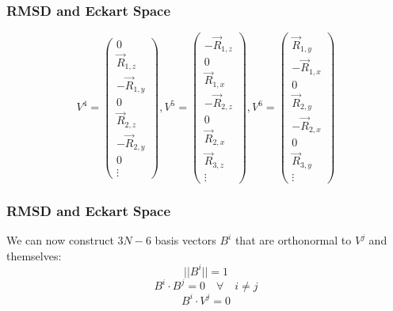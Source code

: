 \documentclass{beamer}
\begin{document}
	\begin{frame}
		\frametitle{RMSD and Eckart Space}
		\begin{equation}
			V^4=\begin{pmatrix}0 \\ \vec{R}_{1,z} \\ -\vec{R}_{1,y} \\ 0 \\ \vec{R}_{2,z} \\ -\vec{R}_{2,y} \\ 0 \\ \vdots \end{pmatrix},
			V^5=\begin{pmatrix}-\vec{R}_{1,z} \\ 0 \\ \vec{R}_{1,x} \\ -\vec{R}_{2,z} \\ 0 \\ \vec{R}_{2,x} \\ \vec{R}_{3,z} \\ \vdots\end{pmatrix},
			V^6=\begin{pmatrix}\vec{R}_{1,y}\\-\vec{R}_{1,x}\\0\\\vec{R}_{2,y}\\-\vec{R}_{2,x}\\0\\\vec{R}_{3,y}\\\vdots\end{pmatrix}
		\end{equation}
	\end{frame}

	\begin{frame}
		\frametitle{RMSD and Eckart Space}
		We can now construct $3N-6$ basis vectors $B^i$ that are orthonormal to $V^j$ and themselves:
		\begin{equation}
		||B^i||=1
		\end{equation}
		\begin{equation}
			B^i\cdot B^j = 0\quad\forall\quad i\neq j
		\end{equation}
		\begin{equation}
			B^i\cdot V^j = 0
		\end{equation}
	\end{frame}
\end{document}
